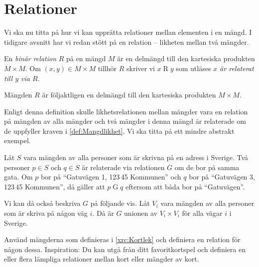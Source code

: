\section{Relationer}\label{Relationer}

Vi ska nu titta på hur vi kan upprätta relationer mellan
elementen i en mängd.
I tidigare avsnitt har vi redan stött på en relation -- likheten mellan två
mängder.

\begin{definition}\label{def:BinarRelation}
  En \emph{binär relation} \(R\) på en mängd \(M\) är en delmängd till den
  kartesiska produkten \(M\times M\).
  Om \((x,y)\in M\times M\) tillhör \(R\) skriver vi \(x\mathop R y\) som 
  utläses
  \emph{\(x\) är relaterat till \(y\) via \(R\)}.
\end{definition}

\begin{remark}\label{RelationDelmangdTillKartesiskProdukt}
  Mängden \(R\) är följaktligen en delmängd till den kartesiska produkten
  \(M\times M\).
\end{remark}

Enligt denna definition skulle likhetsrelationen mellan mängder vara en
relation på mängden av alla mängder och två mängder i denna mängd är relaterade
om de uppfyller kraven i \cref{def:Mangdlikhet}.
Vi ska titta på ett mindre abstrakt exempel.
\begin{example}
  Låt \(S\) vara mängden av alla personer som är skrivna på en adress i
  Sverige.
  Två personer \(p\in S\) och \(q\in S\) är relaterade via relationen \(G\)
  om de bor på samma gata.
  Om \(p\) bor på \enquote{Gatuvägen 1, 123\,45 Kommunen} och \(q\) bor på
  \enquote{Gatuvägen 3, 123\,45 Kommunen}, då gäller att \(p\mathop G q\) 
  eftersom att båda bor på \enquote{Gatuvägen}.

  Vi kan då också beskriva \(G\) på följande vis.
  Låt \(V_i\) vara mängden av alla personer som är skriva på någon väg \(i\).
  Då är \(G\) unionen av \(V_i\times V_i\) för alla vägar \(i\) i Sverige.
\end{example}

\begin{exercise}
  Använd mängderna som definieras i \cref{xrc:Kortlek} och definiera en
  relation för någon dessa.
  Inspiration: Du kan utgå från ditt favoritkortspel och definiera en eller
  flera lämpliga relationer mellan kort eller mängder av kort.
\end{exercise}


